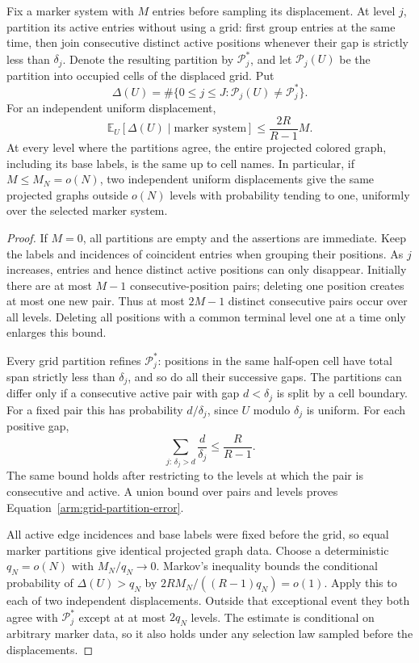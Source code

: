 \begin{lemma}
\label{arm:grid-partition-stability}
Fix a marker system with $M$ entries before sampling its displacement.
At level $j$, partition its active entries without using a grid: first
group entries at the same time, then join consecutive distinct active
positions whenever their gap is strictly less than $\delta_j$.
Denote the resulting partition by $\mathcal P_j^*$, and let
$\mathcal P_j(U)$ be the partition into occupied cells of the displaced
grid.  Put
\[
 \Delta(U)=\#\{0\le j\le J:\mathcal P_j(U)\ne\mathcal P_j^*\}.
\]
For an independent uniform displacement,
\begin{equation}\label{arm:grid-partition-error}
 \mathbb E_U[\Delta(U)\mid\text{marker system}]
 \le \frac{2R}{R-1}M.
\end{equation}
At every level where the partitions agree, the entire projected
colored graph, including its base labels, is the same up to cell names.
In particular, if $M\le M_N=o(N)$, two independent uniform
displacements give the same projected graphs outside $o(N)$ levels
with probability tending to one, uniformly over the selected marker
system.
\end{lemma}

\begin{proof}
If $M=0$, all partitions are empty and the assertions are immediate.
Keep the labels and incidences of coincident entries when grouping
their positions.  As $j$ increases, entries and hence distinct active
positions can only disappear.  Initially there are at most $M-1$
consecutive-position pairs; deleting one position creates at most one
new pair.  Thus at most $2M-1$ distinct consecutive pairs occur over
all levels.  Deleting all positions with a common terminal level one
at a time only enlarges this bound.

Every grid partition refines $\mathcal P_j^*$: positions in the same
half-open cell have total span strictly less than $\delta_j$, and so
do all their successive gaps.  The partitions can differ only if a
consecutive active pair with gap $d<\delta_j$ is split by a cell
boundary.  For a fixed pair this has probability $d/\delta_j$, since
$U$ modulo $\delta_j$ is uniform.  For each positive gap,
\[
 \sum_{j:\,\delta_j>d}\frac d{\delta_j}
 \le \frac R{R-1}.
\]
The same bound holds after restricting to the levels at which the
pair is consecutive and active.  A union bound over pairs and levels
proves Equation~\eqref{arm:grid-partition-error}.

All active edge incidences and base labels were fixed before the grid,
so equal marker partitions give identical projected graph data.
Choose a deterministic $q_N=o(N)$ with $M_N/q_N\to0$.
Markov's inequality bounds the conditional probability of
$\Delta(U)>q_N$ by $2RM_N/((R-1)q_N)=o(1)$.  Apply this to each of
two independent displacements.  Outside that exceptional event they
both agree with $\mathcal P_j^*$ except at at most $2q_N$ levels.
The estimate is conditional on arbitrary marker data, so it also
holds under any selection law sampled before the displacements.
\end{proof}

